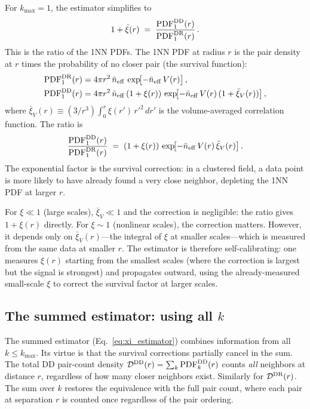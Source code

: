 For $k_{\max} = 1$, the estimator simplifies to
\begin{equation}
  1 + \hat{\xi}(r) \;=\; \frac{\mathrm{PDF}^{\mathrm{DD}}_1(r)}{\mathrm{PDF}^{\mathrm{DR}}_1(r)}\,.
  \label{eq:xi_k1}
\end{equation}
This is the ratio of the 1NN PDFs.  The 1NN PDF at radius $r$ is the pair density at $r$ times the probability of no closer pair (the survival function):
\begin{align}
  \mathrm{PDF}^{\mathrm{DR}}_1(r) &= 4\pi r^2\,\bar{n}_{\rm eff}\,\exp\!\bigl[-\bar{n}_{\rm eff}\,V(r)\bigr]\,,\label{eq:pdf_DR_1}\\
  \mathrm{PDF}^{\mathrm{DD}}_1(r) &= 4\pi r^2\,\bar{n}_{\rm eff}\,(1+\xi(r))\,\exp\!\bigl[-\bar{n}_{\rm eff}\,V(r)\,(1 + \bar{\xi}_V(r))\bigr]\,,\label{eq:pdf_DD_1}
\end{align}
where $\bar{\xi}_V(r) \equiv (3/r^3)\int_0^r \xi(r')\,r'^2\,dr'$ is the volume-averaged correlation function.  The ratio is
\begin{equation}
  \frac{\mathrm{PDF}^{\mathrm{DD}}_1(r)}{\mathrm{PDF}^{\mathrm{DR}}_1(r)} \;=\; (1 + \xi(r))\,\exp\!\bigl[-\bar{n}_{\rm eff}\,V(r)\,\bar{\xi}_V(r)\bigr]\,.
  \label{eq:ratio_k1}
\end{equation}
The exponential factor is the survival correction: in a clustered field, a data point is more likely to have already found a very close neighbor, depleting the 1NN PDF at larger $r$.

For $\xi \ll 1$ (large scales), $\bar{\xi}_V \ll 1$ and the correction is negligible: the ratio gives $1 + \xi(r)$ directly.  For $\xi \sim 1$ (nonlinear scales), the correction matters.  However, it depends only on $\bar{\xi}_V(r)$---the integral of $\xi$ at smaller scales---which is measured from the same data at smaller $r$.  The estimator is therefore self-calibrating: one measures $\xi(r)$ starting from the smallest scales (where the correction is largest but the signal is strongest) and propagates outward, using the already-measured small-scale $\xi$ to correct the survival factor at larger scales.

\subsection{The summed estimator: using all $k$}
\label{sec:summed}

The summed estimator (Eq.~\ref{eq:xi_estimator}) combines information from all $k \leq k_{\max}$.  Its virtue is that the survival corrections partially cancel in the sum.  The total DD pair-count density $\mathcal{D}^{\mathrm{DD}}(r) = \sum_k \mathrm{PDF}^{\mathrm{DD}}_k(r)$ counts \emph{all} neighbors at distance $r$, regardless of how many closer neighbors exist.  Similarly for $\mathcal{D}^{\mathrm{DR}}(r)$.  The sum over $k$ restores the equivalence with the full pair count, where each pair at separation $r$ is counted once regardless of the pair ordering.

